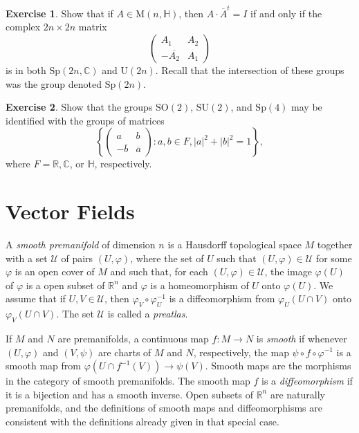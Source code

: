 \documentclass[12pt,reqno]{book}%
\theoremstyle{definition}
\newtheorem{exercise}{Exercise}[chapter]
\theoremstyle{remark}
\theoremstyle{theorem}
\theoremstyle{remark}
\begin{document}
\begin{exercise}\label{}
    Show that if $A \in \mathrm{M}(n,\mathbb{H})$, then $A \cdot \overline{A}^t = I$  if and only if the complex $2n \times 2n$ matrix
    \[
        \begin{pmatrix}
            A_1 & A_2  \\
            -\overline{A_2} & A_1
        \end{pmatrix}
    \]
    is in both $\mathrm{Sp}(2n, \mathbb{C})$ and $\mathrm{U}(2n)$.
    Recall that the intersection of these groups was the group denoted $\mathrm{Sp}(2n)$.
\end{exercise}

\begin{exercise}\label{}
    Show that the groups $\mathrm{SO}(2)$, $\mathrm{SU}(2)$, and $\mathrm{Sp}(4)$ may be identified with the groups of matrices
    \[
        {\left\{ \begin{pmatrix}
                    a & b  \\
                    -\overline{b} & \overline{a}
                \end{pmatrix} : a, b \in F, |a|^2 + |b|^2 = 1\right\}},
    \]
    where $F = \mathbb{R}, \mathbb{C}$, or $\mathbb{H}$, respectively.
\end{exercise}


\chapter{Vector Fields}\label{}%
A \emph{smooth premanifold} of dimension $n$ is a Hausdorff topological space $M$ together with a set $\mathcal{U}$ of pairs $(U, \varphi)$, where the set of $U$ such that $(U, \varphi) \in \mathcal{U}$ for some $\varphi$ is an open cover of $M$ and such that, for each $(U, \varphi) \in \mathcal{U}$, the image $\varphi(U)$ of $\varphi$ is a open subset of $\mathbb{R}^{n}$ and $\varphi$ is a homeomorphism of $U$ onto $\varphi(U)$.
We assume that if $U, V \in \mathcal{U}$, then $\varphi_V \circ \varphi_U^{-1}$ is a diffeomorphism from $\varphi_U(U \cap V)$ onto $\varphi_V(U \cap V)$.
The set $\mathcal{U}$ is called a \emph{preatlas}.

If $M$ and $N$ are premanifolds, a continuous map $f : M \to N$ is \emph{smooth} if whenever $(U, \varphi)$ and $(V, \psi)$ are charts of $M$ and $N$, respectively, the map $\psi \circ f \circ \varphi^{-1}$ is a smooth map from $\varphi(U \cap f^{-1}(V)) \to \psi(V)$.
Smooth maps are the morphisms in the category of smooth premanifolds.
The smooth map $f$ is a \emph{diffeomorphism} if it is a bijection and has a smooth inverse.
Open subsets of $\mathbb{R}^{n}$ are naturally premanifolds, and the definitions of smooth maps and diffeomorphisms are consistent with the definitions already given in that special case.
\end{document}
